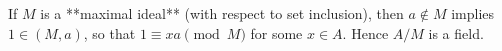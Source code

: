 If $M$ is a **maximal ideal** (with respect to set inclusion), then $a \notin M$ implies $1 \in (M, a)$, so that $1 \equiv xa \pmod{M}$ for some $x \in A$. Hence $A/M$ is a field.
